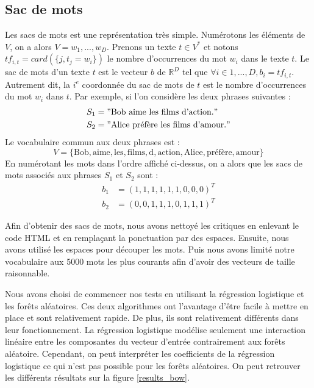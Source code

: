 \documentclass{article}
\begin{document}
\subsection{Sac de mots}

Les sacs de mots \cite{Salton:1986:IMI:576628} est une représentation très simple. Numérotons les éléments de $V$, on a alors $V={w_{1}, ..., w_{D}}$. Prenons un texte $t \in V^{*}$ et notons $tf_{i,t} = card(\{j, t_{j}=w_{i}\})$ le nombre d’occurrences du mot $w_{i}$ dans le texte $t$. Le sac de mots d'un texte $t$ est le vecteur $b$ de $\mathbb{R}^{D}$ tel que $\forall i \in {1, ..., D}, b_{i} = tf_{i,t}$. Autrement dit, la $i^{e}$ coordonnée du sac de mots de $t$ est le nombre d’occurrences du mot $w_{i}$ dans $t$. Par exemple, si l'on considère les deux phrases suivantes :
\begin{align*}
S_{1} & = "\text{Bob aime les films d'action.}" \\
S_{2} & = "\text{Alice préfère les films d'amour.}"
\end{align*}
Le vocabulaire commun aux deux phrases est :
$$
V = \{\text{Bob}, \text{aime}, \text{les}, \text{films}, \text{d}, \text{action}, \text{Alice}, \text{préfère}, \text{amour}\}
$$
En numérotant les mots dans l'ordre affiché ci-dessus, on a alors que les sacs de mots associés aux phrases $S_{1}$ et $S_{2}$ sont :
\begin{align*}
b_{1} & = (1, 1, 1, 1, 1, 1, 0, 0, 0)^{T} \\
b_{2} & = (0, 0, 1, 1, 1, 0, 1, 1, 1)^{T}
\end{align*}

Afin d'obtenir des sacs de mots, nous avons nettoyé les critiques en enlevant le code HTML et en remplaçant la ponctuation par des espaces. Ensuite, nous avons utilisé les espaces pour découper les mots. Puis nous avons limité notre vocabulaire aux 5000 mots les plus courants afin d'avoir des vecteurs de taille raisonnable.

Nous avons choisi de commencer nos tests en utilisant la régression logistique et les forêts aléatoires. Ces deux algorithmes ont l'avantage d'être facile à mettre en place et sont relativement rapide. De plus, ils sont relativement différents dans leur fonctionnement. La régression logistique modélise seulement une interaction linéaire entre les composantes du vecteur d'entrée contrairement aux forêts aléatoire. Cependant, on peut interpréter les coefficients de la régression logistique ce qui n'est pas possible pour les forêts aléatoires. On peut retrouver les différents résultats sur la figure \ref{results_bow}.
\end{document}
